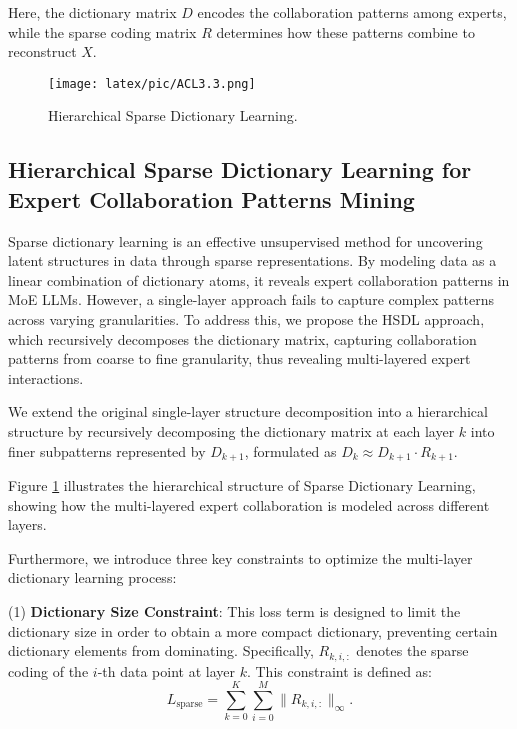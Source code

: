 \documentclass[11pt]{article}
\begin{document}

Here, the dictionary matrix \( D \) encodes the collaboration patterns among experts, while the sparse coding matrix \( R \) determines how these patterns combine to reconstruct \( X \). 

\begin{figure}[ht]
    \centering
    \texttt{[image: latex/pic/ACL3.3.png]}
    \caption{Hierarchical Sparse Dictionary Learning.}
    \label{hierarchical_sparse_dictionary}
\end{figure}

\subsection{Hierarchical Sparse Dictionary Learning for Expert Collaboration Patterns Mining}


Sparse dictionary learning is an effective unsupervised method for uncovering latent structures in data through sparse representations. By modeling data as a linear combination of dictionary atoms, it reveals expert collaboration patterns in MoE LLMs. However, a single-layer approach fails to capture complex patterns across varying granularities. To address this, we propose the HSDL approach, which recursively decomposes the dictionary matrix, capturing collaboration patterns from coarse to fine granularity, thus revealing multi-layered expert interactions.


We extend the original single-layer structure decomposition into a hierarchical structure by recursively decomposing the dictionary matrix at each layer \( k \) into finer subpatterns represented by \( D_{k+1} \), formulated as $D_k \approx D_{k+1} \cdot R_{k+1}$.

Figure \ref{hierarchical_sparse_dictionary} illustrates the hierarchical structure of Sparse Dictionary Learning, showing how the multi-layered expert collaboration is modeled across different layers. 

Furthermore, we introduce three key constraints to optimize the multi-layer dictionary learning process:

(1) \textbf{Dictionary Size Constraint}: This loss term is designed to limit the dictionary size in order to obtain a more compact dictionary,  
preventing certain dictionary elements from dominating. Specifically, \( R_{k,i,:} \) denotes the sparse coding of the \( i \)-th data point at layer \( k \). This constraint is defined as:
\begin{equation}
L_{\text{sparse}} = \sum_{k=0}^K\sum_{i=0}^M\| R_{k,i,:} \|_\infty.
\end{equation}
\end{document}

